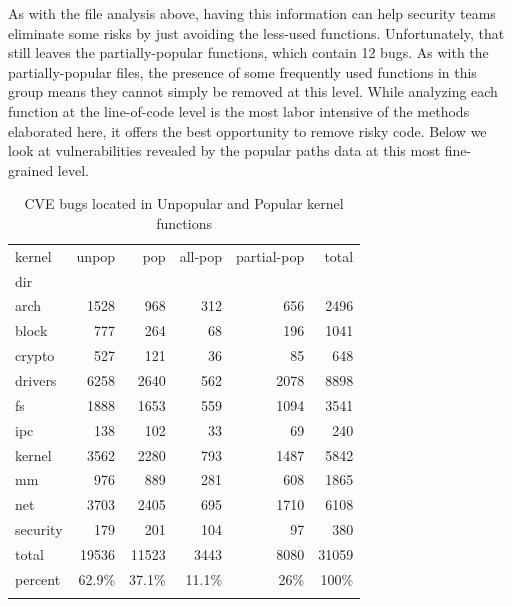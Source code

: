 As with the file analysis above, having this information can help security teams eliminate some risks by just avoiding the less-used functions. 
Unfortunately, that still leaves the partially-popular functions, which  contain 12 bugs.  As with the partially-popular  files, 
the presence of some frequently used functions in this group means they cannot  simply be removed at this level. 
While analyzing each function at the line-of-code level is the most labor intensive of the methods elaborated here, 
it offers the best opportunity to remove risky code. Below we look at vulnerabilities revealed by the popular paths data at this most fine-grained level. 

\begin{table}
\caption{CVE bugs located in Unpopular and Popular kernel functions}
\label{tab:cve_functions}
\begin{tabular}{l|r|r|r|r|r}
 kernel & unpop & pop & all-pop & partial-pop & total \\
 dir & \color{red}{(CVEs)} & \color{red}{(CVEs)} & \color{red}{(CVEs)} & \color{red}{(CVEs)} & \\
 \hline
 arch & 1528\color{red}{(7)} & 968\color{red}{(1)} & 312 & 656\color{red}{(1)} & 2496 \\
 \hline
 block & 777 & 264 & 68 & 196 & 1041 \\
 \hline
 crypto & 527\color{red}{(6)} & 121 & 36 & 85 & 648 \\
 \hline
 drivers & 6258\color{red}{(20)} & 2640 & 562 & 2078 & 8898 \\
 \hline
 fs & 1888\color{red}{(13)} & 1653\color{red}{(3)} & 559 & 1094\color{red}{(3)} & 3541 \\
 \hline
 ipc & 138 & 102 & 33 & 69 & 240 \\
 \hline
 kernel & 3562\color{red}{(8)} & 2280 & 793 & 1487 & 5842 \\
 \hline
 mm & 976\color{red}{(2)} & 889\color{red}{(6)} & 281 & 608\color{red}{(6)} & 1865 \\
 \hline
 net & 3703\color{red}{(9)} & 2405\color{red}{(3)} & 695\color{red}{(1)} & 1710\color{red}{(2)} & 6108 \\
 \hline
 security & 179 & 201 & 104 & 97 & 380 \\
 \hline
 total & 19536\color{red}{(65)} & 11523\color{red}{(13)} & 3443\color{red}{(1)} & 8080\color{red}{(12)} & 31059 \\
 \hline 
 percent & 62.9\% & 37.1\% & 11.1\% & 26\% & 100\% \\
 & \color{red}{(83.3\%)} & \color{red}{(16.7\%)} & \color{red}{(1.3\%)} & \color{red}{(15.4\%)} &
\end{tabular}
\end{table}

